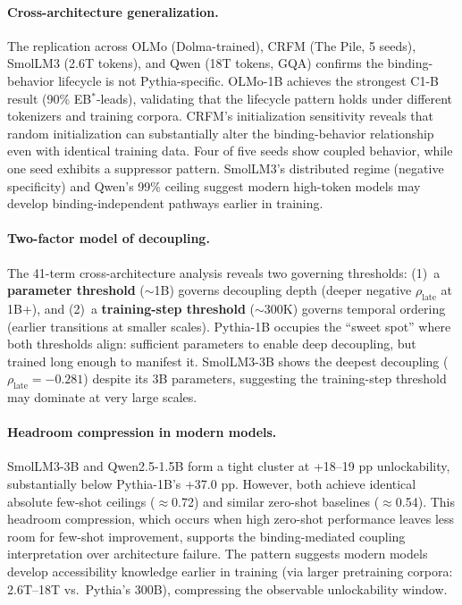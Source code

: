 \documentclass[10pt]{article} %
\begin{document}
\paragraph{Cross-architecture generalization.}
The replication across OLMo (Dolma-trained), CRFM (The Pile, 5 seeds), SmolLM3 (2.6T tokens), and Qwen (18T tokens, GQA) confirms the binding-behavior lifecycle is not Pythia-specific.
OLMo-1B achieves the strongest C1-B result (90\% EB$^*$-leads), validating that the lifecycle pattern holds under different tokenizers and training corpora.
CRFM's initialization sensitivity reveals that random initialization can substantially alter the binding-behavior relationship even with identical training data. Four of five seeds show coupled behavior, while one seed exhibits a suppressor pattern.
SmolLM3's distributed regime (negative specificity) and Qwen's 99\% ceiling suggest modern high-token models may develop binding-independent pathways earlier in training.

\paragraph{Two-factor model of decoupling.}
The 41-term cross-architecture analysis reveals two governing thresholds:
(1)~a \textbf{parameter threshold} ($\sim$1B) governs decoupling depth (deeper negative $\rho_\text{late}$ at 1B+), and
(2)~a \textbf{training-step threshold} ($\sim$300K) governs temporal ordering (earlier transitions at smaller scales).
Pythia-1B occupies the ``sweet spot'' where both thresholds align: sufficient parameters to enable deep decoupling, but trained long enough to manifest it.
SmolLM3-3B shows the deepest decoupling ($\rho_\text{late}=-0.281$) despite its 3B parameters, suggesting the training-step threshold may dominate at very large scales.

\paragraph{Headroom compression in modern models.}
SmolLM3-3B and Qwen2.5-1.5B form a tight cluster at +18--19 pp unlockability, substantially below Pythia-1B's +37.0 pp.
However, both achieve identical absolute few-shot ceilings ($\approx$0.72) and similar zero-shot baselines ($\approx$0.54).
This headroom compression, which occurs when high zero-shot performance leaves less room for few-shot improvement, supports the binding-mediated coupling interpretation over architecture failure.
The pattern suggests modern models develop accessibility knowledge earlier in training (via larger pretraining corpora: 2.6T--18T vs.~Pythia's 300B), compressing the observable unlockability window.
\end{document}
